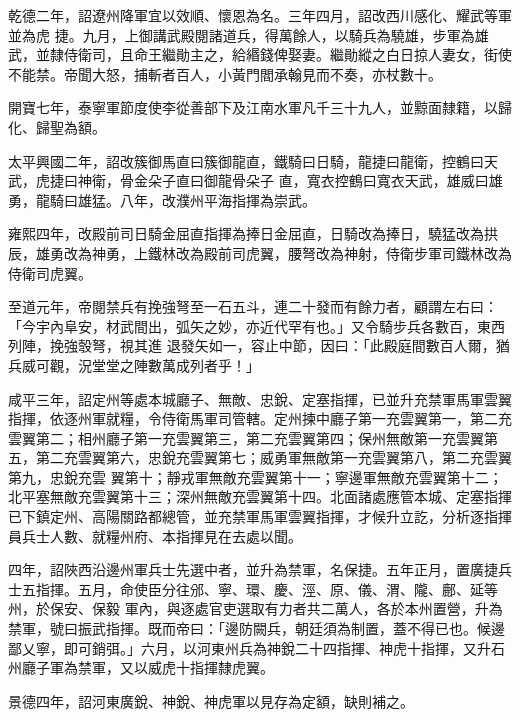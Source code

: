\begin{pinyinscope}
 乾德二年，詔遼州降軍宜以效順、懷恩為名。三年四月，詔改西川感化、耀武等軍並為虎
 捷。九月，上御講武殿閱諸道兵，得萬餘人，以騎兵為驍雄，步軍為雄武，並隸侍衛司，且命王繼勛主之，給緡錢俾娶妻。繼勛縱之白日掠人妻女，街使不能禁。帝聞大怒，捕斬者百人，小黃門閻承翰見而不奏，亦杖數十。



 開寶七年，泰寧軍節度使李從善部下及江南水軍凡千三十九人，並黥面隸籍，以歸化、歸聖為額。



 太平興國二年，詔改簇御馬直曰簇御龍直，鐵騎曰日騎，龍捷曰龍衛，控鶴曰天武，虎捷曰神衛，骨金朵子直曰御龍骨朵子
 直，寬衣控鶴曰寬衣天武，雄威曰雄勇，龍騎曰雄猛。八年，改濮州平海指揮為崇武。



 雍熙四年，改殿前司日騎金屈直指揮為捧日金屈直，日騎改為捧日，驍猛改為拱辰，雄勇改為神勇，上鐵林改為殿前司虎翼，腰弩改為神射，侍衛步軍司鐵林改為侍衛司虎翼。



 至道元年，帝閱禁兵有挽強弩至一石五斗，連二十發而有餘力者，顧謂左右曰：「今宇內阜安，材武間出，弧矢之妙，亦近代罕有也。」又令騎步兵各數百，東西列陣，挽強彀弩，視其進
 退發矢如一，容止中節，因曰：「此殿庭間數百人爾，猶兵威可觀，況堂堂之陣數萬成列者乎！」



 咸平三年，詔定州等處本城廳子、無敵、忠銳、定塞指揮，已並升充禁軍馬軍雲翼指揮，依逐州軍就糧，令侍衛馬軍司管轄。定州揀中廳子第一充雲翼第一，第二充雲翼第二；相州廳子第一充雲翼第三，第二充雲翼第四；保州無敵第一充雲翼第五，第二充雲翼第六，忠銳充雲翼第七；威勇軍無敵第一充雲翼第八，第二充雲翼第九，忠銳充雲
 翼第十；靜戎軍無敵充雲翼第十一；寧邊軍無敵充雲翼第十二；北平塞無敵充雲翼第十三；深州無敵充雲翼第十四。北面諸處應管本城、定塞指揮已下鎮定州、高陽關路都總管，並充禁軍馬軍雲翼指揮，才候升立訖，分析逐指揮員兵士人數、就糧州府、本指揮見在去處以聞。



 四年，詔陜西沿邊州軍兵士先選中者，並升為禁軍，名保捷。五年正月，置廣捷兵士五指揮。五月，命使臣分往邠、寧、環、慶、涇、原、儀、渭、隴、鄜、延等州，於保安、保毅
 軍內，與逐處官吏選取有力者共二萬人，各於本州置營，升為禁軍，號曰振武指揮。既而帝曰：「邊防闕兵，朝廷須為制置，蓋不得已也。候邊鄙乂寧，即可銷弭。」六月，以河東州兵為神銳二十四指揮、神虎十指揮，又升石州廳子軍為禁軍，又以威虎十指揮隸虎翼。



 景德四年，詔河東廣銳、神銳、神虎軍以見存為定額，缺則補之。




\end{pinyinscope}
